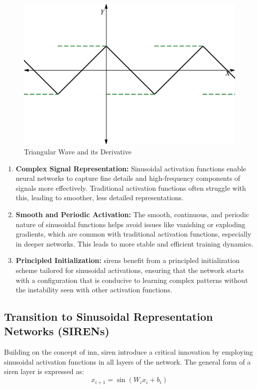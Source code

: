 \documentclass{ioereport}
\begin{document}
    \begin{figure}[H]
        \centering
        \includegraphics[height=0.25\textheight]{assets/triangular-wave.png}
        \caption{Triangular Wave and its Derivative}
        \label{fig:triangular wave}
    \end{figure}
    
    
    \begin{enumerate}[label=\textbf{\roman*.}]
        \item \textbf{Complex Signal Representation:} Sinusoidal activation functions enable neural networks to capture fine details and high-frequency components of signals more effectively. Traditional activation functions often struggle with this, leading to smoother, less detailed representations.
        \item \textbf{Smooth and Periodic Activation:} The smooth, continuous, and periodic nature of sinusoidal functions helps avoid issues like vanishing or exploding gradients, which are common with traditional activation functions, especially in deeper networks. This leads to more stable and efficient training dynamics.
        \item \textbf{Principled Initialization:} \gls{siren}s benefit from a principled initialization scheme tailored for sinusoidal activations, ensuring that the network starts with a configuration that is conducive to learning complex patterns without the instability seen with other activation functions.
    \end{enumerate}
    
    \subsection{Transition to Sinusoidal Representation Networks (SIRENs)}
    Building on the concept of \gls{inn}, \gls{siren} introduce a critical innovation by employing sinusoidal activation functions in all layers of the network. The general form of a \gls{siren} layer is expressed as:
    \begin{equation}
        x_{i+1} = \sin(W_i x_i + b_i)
    \end{equation}
    
\end{document}
